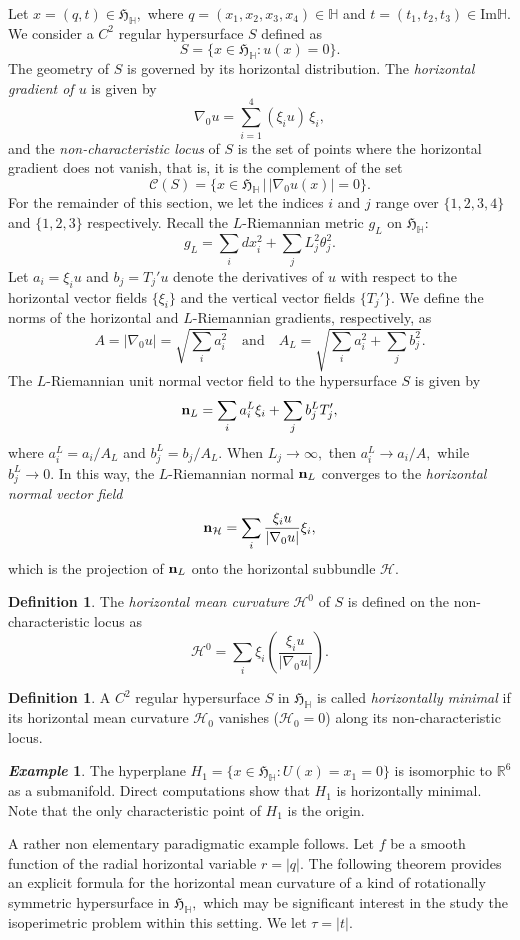 \documentclass [12pt,a4paper]{amsart}
\renewcommand{\Im}{\textrm{Im}}
\newcommand{\calH}{\mathcal{H}}
\newcommand{\mH}{\mathbb{H}}
\newcommand{\frakH}{\mathfrak{H}}
\theoremstyle{plain}
\theoremstyle{definition}
\newtheorem{defi}[thm]{Definition}
\newtheorem{eg}[]{\emph{Example}}
\numberwithin{equation}{section}
\begin{document}
Let $x=(q, t)\in \frakH_\mH,$ where $q=(x_1, x_2, x_3, x_4)\in \mH$ and $t=(t_1, t_2, t_3)\in \Im\mH.$
We consider a $C^2$ regular hypersurface $S$ defined as 
$$
S=\{x\in\frakH_\mH: u(x)=0\}.
$$
The geometry of $S$ is governed by its horizontal distribution. The {\it horizontal gradient of $u$} is given by 
$$
\nabla_0 u =\sum_{i=1}^4 (\xi_i u)\,\xi_i,
$$
and the {\it non-characteristic locus} of $S$ is the set of points where  the horizontal gradient does not vanish, that is, it is the complement of the set 
$$
\mathcal{C}(S)=\{x\in\frakH_\mH\,|\,|\nabla_0 u(x)| = 0\}.
$$
For the remainder of this section, we let the indices $i$ and $j$ range over $\{1, 2, 3, 4\}$ and $\{1, 2, 3\}$ respectively.
Recall the $L$-Riemannian metric $g_L$ on $\frakH_\mH$:
$$g_L=\sum_i dx_i^2+\sum_j L_j^2\theta_j^2.$$
Let $a_i=\xi_i u$ and $b_j=T_j' u$ denote the derivatives of $u$ with respect to the horizontal vector fields $\{\xi_i\}$ and the vertical vector fields $\{T_j'\}$.
We define the norms of the horizontal and $L$-Riemannian gradients, respectively, as
$$A=|\nabla_0 u|=\sqrt{\sum_i a_i^2} \quad \text{and} \quad A_L=\sqrt{\sum_i a_i^2+\sum_j b_j^2}.$$
The $L$-Riemannian unit normal vector field to the hypersurface $S$ is given by
$${\bf n}_L=\sum_{i}a_i^L\xi_i+\sum_{j} b_j^LT_j',$$
where $a_i^L=a_i/A_L$ and $b_j^L=b_j/A_L$.
When $L_j\to\infty,$ then $a_i^L\to a_i/A,$ while $b_j^L\to 0.$
In this way, the $L$-Riemannian normal ${\bf n}_L$ converges to the {\it horizontal normal vector field}
$${\bf n}_\calH=\sum_i \frac{\xi_i u}{|\nabla_0 u|}\xi_i,$$
which is the projection of ${\bf n}_L$ onto the horizontal subbundle $\mathcal{H}$.
\begin{defi}\label{def:hmc}
The {\it horizontal mean curvature} $\calH^0$ of $S$ is defined on the non-characteristic locus as
$$
\calH^0 =\sum_i \xi_i\left(\frac{\xi_i u}{|\nabla_0 u|}\right).
$$
\end{defi}
\begin{defi}
A $C^2$ regular hypersurface $S$ in $\frakH_\mH$ is called  {\it horizontally minimal} if its horizontal mean curvature $\calH_0$ vanishes ($\calH_0=0$) along its non-characteristic locus.
\end{defi}
\begin{eg}
The hyperplane $H_1 = \{x \in \frakH_\mH : U(x)=x_1 = 0\}$ is isomorphic to $\mathbb{R}^6$ as a submanifold. Direct computations show that $H_1$ is horizontally minimal. Note that the only characteristic point of $H_1$ is the origin.
\end{eg}
A rather non elementary paradigmatic example follows. Let $f$ be a smooth function of the radial horizontal variable $r=|q|.$ The following theorem provides an explicit formula for the horizontal mean curvature of a  kind of rotationally symmetric hypersurface in $\frakH_\mH,$ which may be significant interest in the study the isoperimetric problem within this setting. We let $\tau=|t|$.
\end{document}
